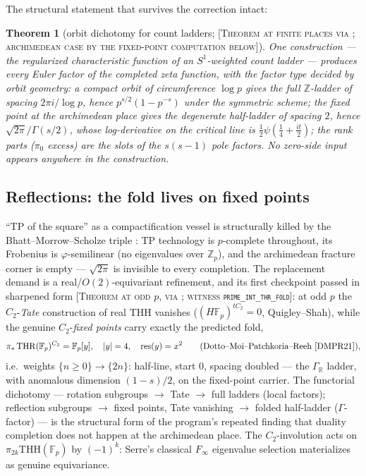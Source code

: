 \documentclass[11pt,reqno]{amsart}
\theoremstyle{plain}
\newtheorem{theorem}{Theorem}[section]
\theoremstyle{definition}
\theoremstyle{remark}
\newcommand{\R}{\mathbb{R}}
\newcommand{\Z}{\mathbb{Z}}
\newcommand{\F}{\mathbb{F}}
\newcommand{\THH}{\mathrm{THH}}
\newcommand{\THR}{\mathrm{THR}}
\newcommand{\grade}[1]{\textup{[\textsc{#1}]}}
\DeclareMathOperator{\res}{res}
\begin{document}
The structural statement that survives the correction intact:

\begin{theorem}[orbit dichotomy for count ladders; \grade{Theorem at finite places via
\cite{Hesselholt16,Deninger92}; archimedean case by the fixed-point computation below}]
\label{thm:dichotomy}
One construction --- the regularized characteristic function of an $S^1$-weighted count
ladder --- produces every Euler factor of the completed zeta function, with the factor type
decided by orbit geometry: a compact orbit of circumference $\log p$ gives the full
$\Z$-ladder of spacing $2\pi i/\log p$, hence $p^{s/2}(1 - p^{-s})$ under the symmetric
scheme; the fixed point at the archimedean place gives the degenerate half-ladder of spacing
$2$, hence $\sqrt{2\pi}/\Gamma(s/2)$, whose log-derivative on the critical line is
$\tfrac12\psi(\tfrac14 + \tfrac{it}{2})$; the rank parts ($\pi_0$ excess) are the slots of
the $s(s-1)$ pole factors. No zero-side input appears anywhere in the construction.
\end{theorem}

\subsection{Reflections: the fold lives on fixed points}\label{subsec:fold}

``TP of the square'' as a compactification vessel is structurally killed by the
Bhatt--Morrow--Scholze triple \cite{BMS18}: TP technology is $p$-complete throughout, its
Frobenius is $\varphi$-semilinear (no eigenvalues over $\Z_p$), and the archimedean fracture
corner is empty --- $\sqrt{2\pi}$ is invisible to every completion. The replacement demand is
a real/$O(2)$-equivariant refinement, and its first checkpoint passed in sharpened form
\grade{Theorem at odd $p$, via \cite{DMPR21,QS21}; witness \texttt{prime\_\allowbreak int\_\allowbreak thr\_\allowbreak fold}}:
at odd $p$ the $C_2$-\emph{Tate} construction of real THH vanishes
($(H\F_p)^{tC_2} = 0$, Quigley--Shah), while the genuine $C_2$-\emph{fixed points} carry
exactly the predicted fold,
\[
\pi_*\,\THR(\F_p)^{C_2} = \F_p[y], \quad |y| = 4, \quad \res(y) = x^2
\qquad \text{(Dotto--Moi--Patchkoria--Reeh \cite{DMPR21})},
\]
i.e.\ weights $\{n \ge 0\} \to \{2n\}$: half-line, start $0$, spacing doubled --- the
$\Gamma_\R$ ladder, with anomalous dimension $(1-s)/2$, on the fixed-point carrier. The
functorial dichotomy --- rotation subgroups $\to$ Tate $\to$ full ladders (local factors);
reflection subgroups $\to$ fixed points, Tate vanishing $\to$ folded half-ladder
($\Gamma$-factor) --- is the structural form of the program's repeated finding that duality
completion does not happen at the archimedean place. The $C_2$-involution acts on
$\pi_{2k}\THH(\F_p)$ by $(-1)^k$: Serre's classical $F_\infty$ eigenvalue selection
materializes as genuine equivariance.
\end{document}
